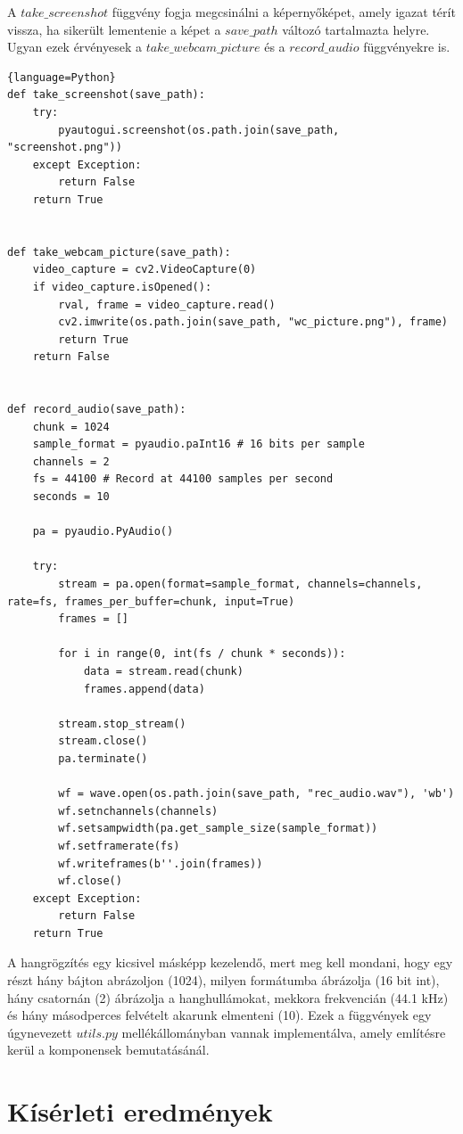 \documentclass[12pt,a4paper,oneside]{report}
\begin{document}
A $take\_screenshot$ függvény fogja megcsinálni a képernyőképet, amely igazat térít vissza, ha sikerült lementenie a képet a $save\_path$ változó tartalmazta helyre. Ugyan ezek érvényesek a $take\_webcam\_picture$ és a $record\_audio$ függvényekre is.
\begin{lstlisting}{language=Python}
def take_screenshot(save_path):
	try:
		pyautogui.screenshot(os.path.join(save_path, "screenshot.png"))
	except Exception:
		return False
	return True

	
def take_webcam_picture(save_path):
	video_capture = cv2.VideoCapture(0)
	if video_capture.isOpened():
		rval, frame = video_capture.read()
		cv2.imwrite(os.path.join(save_path, "wc_picture.png"), frame)
		return True
	return False


def record_audio(save_path):
	chunk = 1024
	sample_format = pyaudio.paInt16 # 16 bits per sample
	channels = 2
	fs = 44100 # Record at 44100 samples per second
	seconds = 10

	pa = pyaudio.PyAudio()

	try:
		stream = pa.open(format=sample_format, channels=channels, rate=fs, frames_per_buffer=chunk, input=True)
		frames = []

		for i in range(0, int(fs / chunk * seconds)):
			data = stream.read(chunk)
			frames.append(data)

		stream.stop_stream()
		stream.close()
		pa.terminate()

		wf = wave.open(os.path.join(save_path, "rec_audio.wav"), 'wb')
		wf.setnchannels(channels)
		wf.setsampwidth(pa.get_sample_size(sample_format))
		wf.setframerate(fs)
		wf.writeframes(b''.join(frames))
		wf.close()
	except Exception:
		return False
	return True
\end{lstlisting}
A hangrögzítés egy kicsivel másképp kezelendő, mert meg kell mondani, hogy egy részt hány bájton abrázoljon (1024), milyen formátumba ábrázolja (16 bit int), hány csatornán (2) ábrázolja a hanghullámokat, mekkora frekvencián (44.1 kHz) és hány másodperces felvételt akarunk elmenteni (10). Ezek a függvények egy úgynevezett $utils.py$ mellékállományban vannak implementálva, amely említésre kerül a komponensek bemutatásánál.


\chapter{Kísérleti eredmények}\label{sec:testcases}
\end{document}
